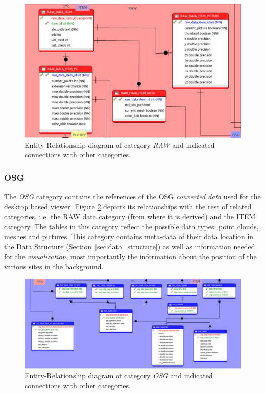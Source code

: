 \begin{figure}[H]
\centering
\includegraphics[scale=0.35]{fig/database/ERDB_RAW_conn.pdf}
\caption{Entity-Relationship diagram of category {\em RAW} and indicated connections
with other categories.}
\label{fig:db_erdb_raw}
\end{figure}

\subsubsection{OSG}
The {\em OSG} category contains the references of the OSG \textit{converted data} used for the
desktop based viewer. Figure \ref{fig:db_erdb_osg} depicts its relationships with the rest of related categories, i.e. the RAW data category
(from where it is derived) and the ITEM category. The tables in this category
reflect the possible data types: point clouds, meshes and pictures. This category contains meta-data of their data location in the Data Structure (Section~\ref{sec:data_structure}) as well as information needed for the \textit{visualization}, most importantly the information about the position of the various sites in the background.

\begin{figure}[H]
\centering
\includegraphics[scale=0.35]{fig/database/ERDB_OSG_conn.pdf}
\caption{Entity-Relationship diagram of category {\em OSG} and indicated connections
with other categories.}
\label{fig:db_erdb_osg}
\end{figure}

